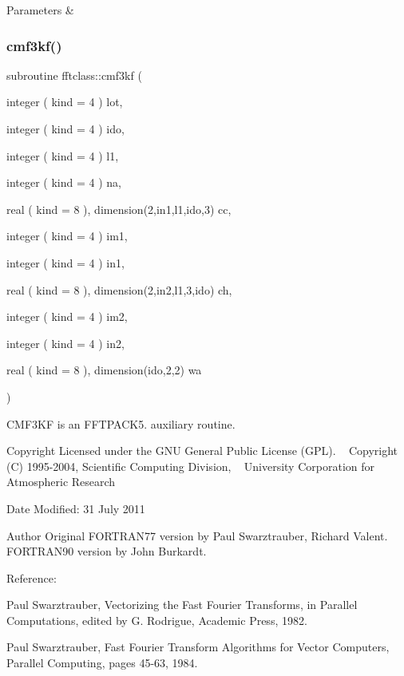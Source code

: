 \begin{DoxyParams}{Parameters}
{\em } & \\
\hline
\end{DoxyParams}
\mbox{\label{namespacefftclass_a449e799516aa491a87b0f5937a7abc86}} 
\subsubsection{\texorpdfstring{cmf3kf()}{cmf3kf()}}
{\footnotesize\ttfamily subroutine fftclass\+::cmf3kf (\begin{DoxyParamCaption}\item[{integer ( kind = 4 )}]{lot,  }\item[{integer ( kind = 4 )}]{ido,  }\item[{integer ( kind = 4 )}]{l1,  }\item[{integer ( kind = 4 )}]{na,  }\item[{real ( kind = 8 ), dimension(2,in1,l1,ido,3)}]{cc,  }\item[{integer ( kind = 4 )}]{im1,  }\item[{integer ( kind = 4 )}]{in1,  }\item[{real ( kind = 8 ), dimension(2,in2,l1,3,ido)}]{ch,  }\item[{integer ( kind = 4 )}]{im2,  }\item[{integer ( kind = 4 )}]{in2,  }\item[{real ( kind = 8 ), dimension(ido,2,2)}]{wa }\end{DoxyParamCaption})}



C\+M\+F3\+KF is an F\+F\+T\+P\+A\+C\+K5. auxiliary routine. 

\begin{DoxyCopyright}{Copyright}
Licensed under the G\+NU General Public License (G\+PL). ~\newline
 Copyright (C) 1995-\/2004, Scientific Computing Division, ~\newline
 University Corporation for Atmospheric Research 
\end{DoxyCopyright}
\begin{DoxyDate}{Date}
Modified\+: 31 July 2011 
\end{DoxyDate}
\begin{DoxyAuthor}{Author}
Original F\+O\+R\+T\+R\+A\+N77 version by Paul Swarztrauber, Richard Valent. ~\newline
 F\+O\+R\+T\+R\+A\+N90 version by John Burkardt.
\end{DoxyAuthor}
\begin{DoxyVerb}  Reference:

    Paul Swarztrauber,
    Vectorizing the Fast Fourier Transforms,
    in Parallel Computations,
    edited by G. Rodrigue,
    Academic Press, 1982.

    Paul Swarztrauber,
    Fast Fourier Transform Algorithms for Vector Computers,
    Parallel Computing, pages 45-63, 1984.\end{DoxyVerb}
 
